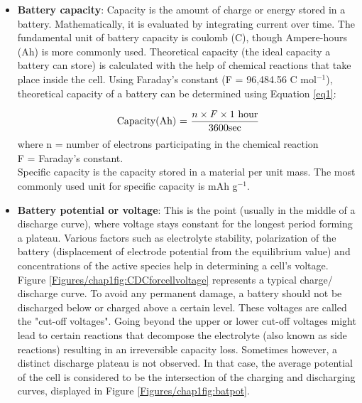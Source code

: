 \begin{itemize}
\item \textbf{Battery capacity}: Capacity is the amount of charge or energy stored in a battery. Mathematically, it is evaluated by integrating current over time. The fundamental unit of battery capacity is coulomb (C), though Ampere-hours (Ah) is more commonly used. Theoretical capacity (the ideal capacity a battery can store) is calculated with the help of chemical reactions that take place inside the cell. Using Faraday's constant (F = 96,484.56 C mol$^{-1}$), theoretical capacity of a battery can be determined using Equation \ref{eq1}:

\begin{equation} \label{eq1}
  \text{Capacity(Ah) = } \frac{n \times F \times 1 \text{ hour}}{3600 \text{sec}}\\
\end{equation}
where n = number of electrons participating in the chemical reaction \\
F = Faraday's constant. \\ Specific capacity is the capacity stored in a material per unit mass. The most commonly used unit for specific capacity is mAh g$^{-1}$. 
\item \textbf{Battery potential or voltage}: This is the point (usually in the middle of a discharge curve), where voltage stays constant for the longest period forming a plateau. Various factors such as electrolyte stability, polarization of the battery (displacement of electrode potential from the equilibrium value) and concentrations of the active species help in determining a cell's voltage. Figure \ref{Figures/chap1fig:CDCforcellvoltage} represents a typical charge/ discharge curve. To avoid any permanent damage, a battery should not be discharged below or charged above a certain level. These voltages are called the "cut-off voltages". Going beyond the upper or lower cut-off voltages might lead to certain reactions that decompose the electrolyte (also known as side reactions) resulting in an irreversible capacity loss. Sometimes however, a distinct discharge plateau is not observed. In that case, the average potential of the cell is considered to be the intersection of the charging and discharging curves, displayed in Figure \ref{Figures/chap1fig:batpot}. 


\end{itemize}
